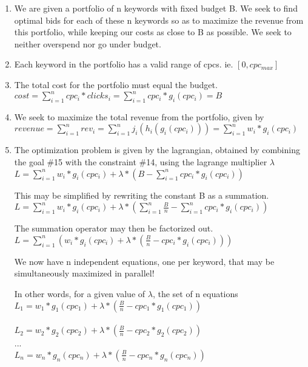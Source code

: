 \documentclass{article}
\begin{document}
\begin{enumerate}
\item We are given a portfolio of n keywords with fixed budget B. We seek to find optimal bids for each of these n keywords so as to maximize the revenue from this portfolio, while keeping our costs as close to B as possible. We seek to neither overspend nor go under budget.

\item Each keyword in the portfolio has a valid range of cpcs. ie. $[0, cpc_{max}]$

\item
The total cost for the portfolio must equal the budget.\\
$cost = \sum\limits_{i=1}^{n}{cpc_i * clicks_i} = \sum\limits_{i=1}^{n}cpc_i * g_i(cpc_i) = B$

\item
We seek to maximize the total revenue from the portfolio, given by \\
$revenue = \sum\limits_{i=1}^{n}{rev_i} = \sum\limits_{i=1}^{n}{j_i(h_i(g_i(cpc_i)))} = \sum\limits_{i=1}^{n}{w_i*g_i(cpc_i)}$

\item
The optimization problem is given by the lagrangian, obtained by combining the goal \#15 with the constraint \#14, using the lagrange multiplier $\lambda$ \\
$L =  \sum\limits_{i=1}^{n}{w_i*g_i(cpc_i)} + \lambda* (B - \sum\limits_{i=1}^{n}cpc_i * g_i(cpc_i)) $

This may be simplified by rewriting the constant B as a summation.\\
$L =  \sum\limits_{i=1}^{n}{w_i*g_i(cpc_i)} + \lambda* (\sum\limits_{i=1}^{n}{\frac{B}{n}} - \sum\limits_{i=1}^{n}cpc_i * g_i(cpc_i)) $

The summation operator may then be factorized out.\\
$L =  \sum\limits_{i=1}^{n}{({w_i*g_i(cpc_i)} + \lambda* (\frac{B}{n} - cpc_i * g_i(cpc_i)))} $

We now have n independent equations, one per keyword, that may be simultaneously maximized in parallel!

In other words, for a given value of $\lambda$, the set of n equations
\\
$L_1 = {w_1*g_1(cpc_1)} + \lambda* (\frac{B}{n} - cpc_1 * g_1(cpc_1))$
\\
\\
$L_2 = {w_2*g_2(cpc_2)} + \lambda* (\frac{B}{n} - cpc_2 * g_2(cpc_2))$
\\
...
\\
$L_n = {w_n*g_n(cpc_n)} + \lambda* (\frac{B}{n} - cpc_n * g_n(cpc_n))$


\end{enumerate}
\end{document}

